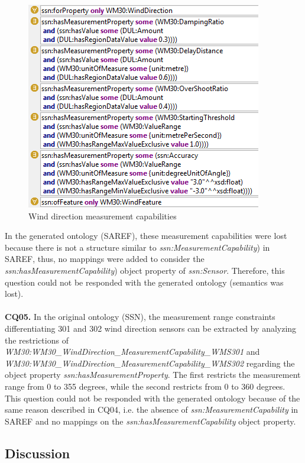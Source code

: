\documentclass{sig-alternate-05-2015}
\begin{document}
\begin{figure}[h!]
\centering
\includegraphics[scale=0.87]{SSN_MeasurementCapability}
\caption{Wind direction measurement capabilities} 
\label{fig:SSN_MeasurementCapability}
\end{figure}

In the generated ontology (SAREF), these measurement capabilities were lost because there is not a structure similar to \textit{ssn:MeasurementCapability}) in SAREF, thus, no mappings were added to consider the  \textit{ssn:hasMeasurementCapability}) object property of \textit{ssn:Sensor}. Therefore, this question could not be responded with the generated ontology (semantics was lost).  
\\\\\textbf{CQ05.} In the original ontology (SSN), the measurement range constraints differentiating 301 and 302 wind direction sensors can be extracted by analyzing the restrictions of \textit{WM30:WM30\_WindDirection\_MeasurementCapability\_WMS301} and \textit{WM30:WM30\_WindDirection\_MeasurementCapability\_WMS302} regarding the object property \textit{ssn:hasMeasurementProperty}. The first restricts the measurement range from 0 to 355 degrees, while the second restricts from 0 to 360 degrees. This question could not be responded with the generated ontology because of the same reason described in CQ04, i.e. the absence of \textit{ssn:MeasurementCapability} in SAREF and no mappings on the \textit{ssn:hasMeasurementCapability} object property.


\subsection{Discussion}
\end{document}
